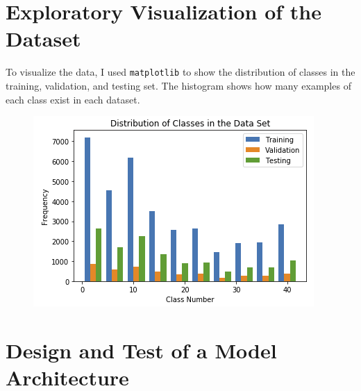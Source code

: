 \documentclass[12pt]{article}
\begin{document}
\section{Exploratory Visualization of the Dataset}
To visualize the data, I used \texttt{matplotlib} to show the distribution of classes in the training, validation, and testing set. The histogram shows how many examples of each class exist in each dataset.
\begin{figure}[!h]
\includegraphics[scale=0.7]{writeup_images/distribution_classes.png}
\end{figure}

\section{Design and Test of a Model Architecture}
\end{document}
